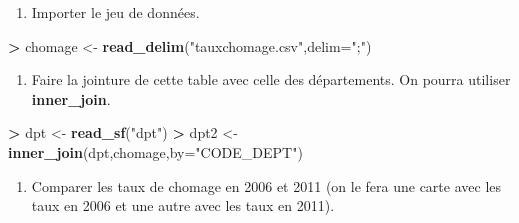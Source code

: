 \documentclass[]{book}
\newenvironment{Shaded}{\begin{snugshade}}{\end{snugshade}}
\newcommand{\DataTypeTok}[1]{\textcolor[rgb]{0.13,0.29,0.53}{#1}}
\newcommand{\KeywordTok}[1]{\textcolor[rgb]{0.13,0.29,0.53}{\textbf{#1}}}
\newcommand{\NormalTok}[1]{#1}
\newcommand{\OperatorTok}[1]{\textcolor[rgb]{0.81,0.36,0.00}{\textbf{#1}}}
\newcommand{\StringTok}[1]{\textcolor[rgb]{0.31,0.60,0.02}{#1}}
\providecommand{\tightlist}{%
  \setlength{\itemsep}{0pt}\setlength{\parskip}{0pt}}
\theoremstyle{definition}
\theoremstyle{definition}
\theoremstyle{definition}
\theoremstyle{remark}
\begin{document}
\begin{enumerate}
\def\labelenumi{\arabic{enumi}.}
\tightlist
\item
  Importer le jeu de données.
\end{enumerate}

\begin{Shaded}
\begin{Highlighting}[]
\OperatorTok{>}\StringTok{ }\NormalTok{chomage <-}\StringTok{ }\KeywordTok{read_delim}\NormalTok{(}\StringTok{"tauxchomage.csv"}\NormalTok{,}\DataTypeTok{delim=}\StringTok{";"}\NormalTok{)}
\end{Highlighting}
\end{Shaded}

\begin{enumerate}
\def\labelenumi{\arabic{enumi}.}
\setcounter{enumi}{1}
\tightlist
\item
  Faire la jointure de cette table avec celle des départements. On pourra utiliser \textbf{inner\_join}.
\end{enumerate}

\begin{Shaded}
\begin{Highlighting}[]
\OperatorTok{>}\StringTok{ }\NormalTok{dpt <-}\StringTok{ }\KeywordTok{read_sf}\NormalTok{(}\StringTok{"dpt"}\NormalTok{)}
\OperatorTok{>}\StringTok{ }\NormalTok{dpt2 <-}\StringTok{ }\KeywordTok{inner_join}\NormalTok{(dpt,chomage,}\DataTypeTok{by=}\StringTok{"CODE_DEPT"}\NormalTok{)}
\end{Highlighting}
\end{Shaded}

\begin{enumerate}
\def\labelenumi{\arabic{enumi}.}
\setcounter{enumi}{2}
\tightlist
\item
  Comparer les taux de chomage en 2006 et 2011 (on le fera une carte avec les taux en 2006 et une autre avec les taux en 2011).
\end{enumerate}

\begin{Shaded}
\end{Shaded}
\end{document}
